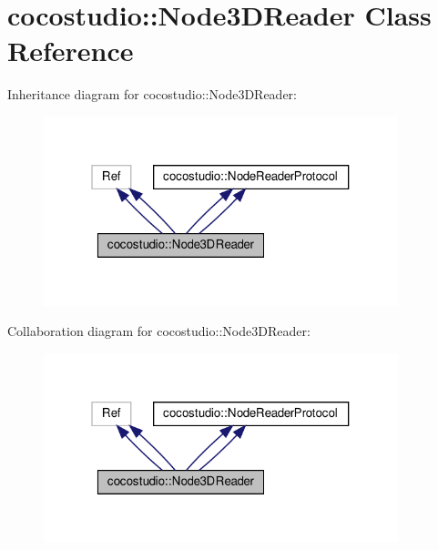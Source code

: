 \hypertarget{classcocostudio_1_1Node3DReader}{}\section{cocostudio\+:\+:Node3\+D\+Reader Class Reference}
\label{classcocostudio_1_1Node3DReader}


Inheritance diagram for cocostudio\+:\+:Node3\+D\+Reader\+:
\nopagebreak
\begin{figure}[H]
\begin{center}
\leavevmode
\includegraphics[width=292pt]{classcocostudio_1_1Node3DReader__inherit__graph}
\end{center}
\end{figure}


Collaboration diagram for cocostudio\+:\+:Node3\+D\+Reader\+:
\nopagebreak
\begin{figure}[H]
\begin{center}
\leavevmode
\includegraphics[width=292pt]{classcocostudio_1_1Node3DReader__coll__graph}
\end{center}
\end{figure}
